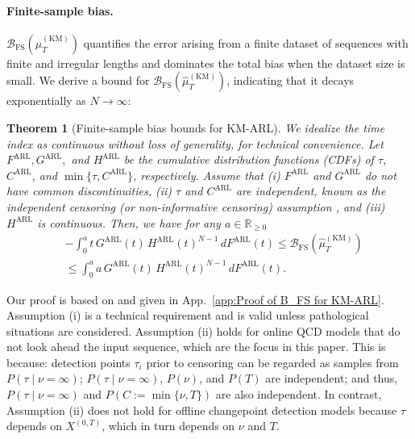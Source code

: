 \documentclass{article}
\theoremstyle{plain}
\newtheorem{theorem}{Theorem}[section]
\theoremstyle{definition}
\theoremstyle{remark}
\def\nn{\nonumber \\ }
\def\mbr{\mathbb{R}}
\begin{document}
\paragraph{Finite-sample bias.}
$\mathcal{B}_\mathrm{FS}(\hat{\mu}_T^\mathrm{(KM)})$ quantifies the error arising from a finite dataset of sequences with finite and irregular lengths and dominates the total bias when the dataset size is small.
We derive a bound for $\mathcal{B}_\mathrm{FS}(\hat{\mu}_T^\mathrm{(KM)})$, indicating that it decays exponentially as $N \rightarrow \infty$:
\begin{theorem}[Finite-sample bias bounds for KM-ARL] \label{thm:Finite-sample bias bounds for KM-ARL}
    We idealize the time index as continuous without loss of generality, for technical convenience.
    Let $F^\mathrm{ARL}, G^\mathrm{ARL},$ and $H^\mathrm{ARL}$ be the cumulative distribution functions (CDFs) of $\tau$, $C^\mathrm{ARL}$, and $\min\{\tau, C^\mathrm{ARL}\}$, respectively. 
    Assume that (i) $F^\mathrm{ARL}$ and $G^\mathrm{ARL}$ do not have common discontinuities,  (ii) $\tau$ and $C^\mathrm{ARL}$ are independent, known as the \textit{independent censoring} (or non-informative censoring) assumption \citep{ranganathan2012censoring}, and (iii) $H^\mathrm{ARL}$ is continuous. Then, we have for any $a \in \mbr_{\geq 0}$
    \begin{align}
        &-\int_0^{a} t \,G^\mathrm{ARL}(t)\,{H^\mathrm{ARL}}(t)^{N-1}\,dF^\mathrm{ARL}(t) 
        \leq
        \mathcal{B}_\mathrm{FS}(\hat{\mu}_T^\mathrm{(KM)}) \nn  
        &\leq
        \int_0^{a} a\,G^\mathrm{ARL}(t)\,{H^\mathrm{ARL}}(t)^{N-1}\,dF^\mathrm{ARL}(t).
    \end{align}
\end{theorem}
Our proof is based on \citep{stute1993strong, stute1994bias} and given in App.~\ref{app:Proof of B_FS for KM-ARL}.
Assumption (i) is a technical requirement and is valid unless pathological situations are considered. 
Assumption (ii) holds for online QCD models that do not look ahead the input sequence, which are the focus in this paper.
This is because: detection points $\tau_i$ prior to censoring can be regarded as samples from $P(\tau \mid \nu=\infty)$;  $P(\tau \mid \nu=\infty)$, $P(\nu)$, and $P(T)$ are independent; and thus, $P(\tau \mid \nu=\infty)$ and $P(C:= \min\{\nu, T\})$ are also independent.
In contrast, Assumption (ii) does not hold for offline changepoint detection models because $\tau$ depends on $X^{(0, T)}$, which in turn depends on $\nu$ and $T$.
\end{document}
